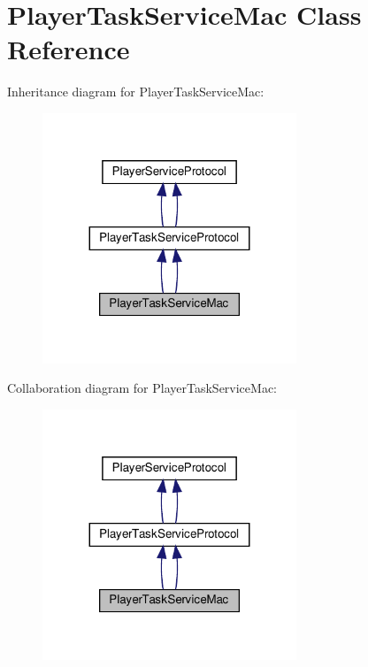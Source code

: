 \hypertarget{classPlayerTaskServiceMac}{}\section{Player\+Task\+Service\+Mac Class Reference}
\label{classPlayerTaskServiceMac}


Inheritance diagram for Player\+Task\+Service\+Mac\+:
\nopagebreak
\begin{figure}[H]
\begin{center}
\leavevmode
\includegraphics[width=215pt]{classPlayerTaskServiceMac__inherit__graph}
\end{center}
\end{figure}


Collaboration diagram for Player\+Task\+Service\+Mac\+:
\nopagebreak
\begin{figure}[H]
\begin{center}
\leavevmode
\includegraphics[width=215pt]{classPlayerTaskServiceMac__coll__graph}
\end{center}
\end{figure}
